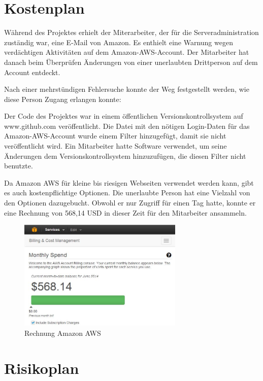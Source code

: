 \documentclass{article}
\begin{document}
\section{Kostenplan}
Während des Projektes erhielt der Miterarbeiter, der für die Serveradministration zuständig war, eine E-Mail von Amazon. Es enthielt eine Warnung wegen verdächtigen Aktivitäten auf dem Amazon-AWS-Account. Der Mitarbeiter hat danach beim Überprüfen Änderungen von einer unerlaubten Drittperson auf dem Account entdeckt.

Nach einer mehrstündigen Fehlersuche konnte der Weg festgestellt werden, wie diese Person Zugang erlangen konnte: 

Der Code des Projektes war in einem öffentlichen Versionskontrollsystem auf www.github.com veröffentlicht. Die Datei mit den nötigen Login-Daten für das Amazon-AWS-Account wurde einem Filter hinzugefügt, damit sie nicht veröffentlicht wird. Ein Mitarbeiter hatte Software verwendet, um seine Änderungen dem Versionskontrollsystem hinzuzufügen, die diesen Filter nicht benutzte.

Da Amazon AWS für kleine bis riesigen Webseiten verwendet werden kann, gibt es auch kostenpflichtige Optionen. Die unerlaubte Person hat eine Vielzahl von den Optionen dazugebucht. Obwohl er nur Zugriff für einen Tag hatte, konnte er eine Rechnung von 568,14 USD in dieser Zeit für den Mitarbeiter ansammeln.

\begin{figure}[H]
    \centering
    \includegraphics[width=0.7\textwidth]{images/amazon-bill.jpg}
    \caption{Rechnung Amazon AWS}
    \label{fig:bill}
\end{figure}



\section{Risikoplan}
\end{document}
